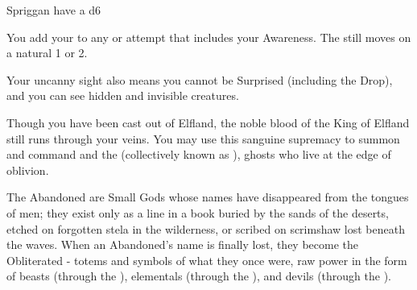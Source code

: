 

   Spriggan have a d6 \FLESH
   


  You add your \LVL to any \RO or \RB attempt that includes your Awareness.  The \UD still moves \DCDOWN on a natural 1 or 2.

  Your uncanny sight also means you cannot be Surprised (including the Drop), and you can see hidden and invisible creatures.

  \newpage





  Though you have been cast out of Elfland, the noble blood of the King of Elfland still runs through your veins.  You may use this sanguine supremacy to summon and command  and the  (collectively known as  ), ghosts who live at the edge of oblivion.

The Abandoned are Small Gods whose names have disappeared from the tongues of men; they exist only as a line in a book buried by the sands of the deserts, etched on forgotten stela in the wilderness, or scribed on scrimshaw lost beneath the waves.  When an Abandoned's name is finally lost, they become the Obliterated - totems and symbols of what they once were, raw power in the form of beasts (through the ), elementals (through the ), and devils (through the ).

